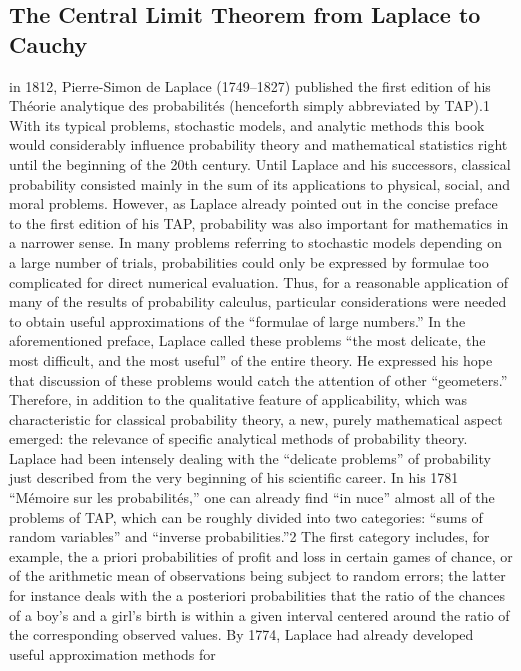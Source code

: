 \documentclass{article}
\begin{document}
\subsection{The Central Limit Theorem from Laplace to Cauchy }
in 1812, Pierre-Simon de Laplace (1749–1827) published the first edition of his
Théorie analytique des probabilités (henceforth simply abbreviated by TAP).1 With
its typical problems, stochastic models, and analytic methods this book would considerably influence probability theory and mathematical statistics right until the beginning of the 20th century.\cite{Fischer2010History}
Until Laplace and his successors, classical probability consisted mainly in the
sum of its applications to physical, social, and moral problems. However, as Laplace
already pointed out in the concise preface to the first edition of his TAP, probability
was also important for mathematics in a narrower sense. In many problems referring
to stochastic models depending on a large number of trials, probabilities could only
be expressed by formulae too complicated for direct numerical evaluation. Thus,
for a reasonable application of many of the results of probability calculus, particular considerations were needed to obtain useful approximations of the “formulae
of large numbers.” In the aforementioned preface, Laplace called these problems
“the most delicate, the most difficult, and the most useful” of the entire theory.
He expressed his hope that discussion of these problems would catch the attention of
other “geometers.” Therefore, in addition to the qualitative feature of applicability,
which was characteristic for classical probability theory, a new, purely mathematical
aspect emerged: the relevance of specific analytical methods of probability theory.
Laplace had been intensely dealing with the “delicate problems” of probability
just described from the very beginning of his scientific career. In his 1781 “Mémoire
sur les probabilités,” one can already find “in nuce” almost all of the problems of
TAP, which can be roughly divided into two categories: “sums of random variables”
and “inverse probabilities.”2 The first category includes, for example, the a priori
probabilities of profit and loss in certain games of chance, or of the arithmetic mean
of observations being subject to random errors; the latter for instance deals with the
a posteriori probabilities that the ratio of the chances of a boy’s and a girl’s birth
is within a given interval centered around the ratio of the corresponding observed
values. By 1774, Laplace had already developed useful approximation methods for
\end{document}
